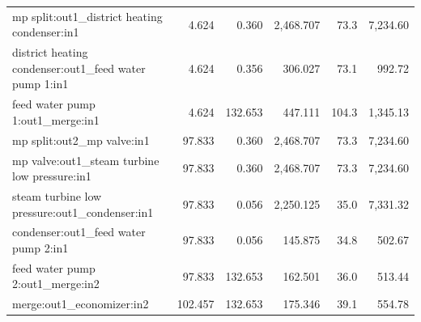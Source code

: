 \documentclass[]{article}
\begin{document}
\begin{table}[H]
\begin{tabular}{lrrrrr}
mp split:out1\_district heating condenser:in1                  &                     4.624 &                                              0.360 &                  2,468.707 &                                                       73.3 &                   7,234.60 \\
district heating condenser:out1\_feed water pump 1:in1         &                     4.624 &                                              0.356 &                    306.027 &                                                       73.1 &                     992.72 \\
feed water pump 1:out1\_merge:in1                              &                     4.624 &                                            132.653 &                    447.111 &                                                      104.3 &                   1,345.13 \\
mp split:out2\_mp valve:in1                                    &                    97.833 &                                              0.360 &                  2,468.707 &                                                       73.3 &                   7,234.60 \\
mp valve:out1\_steam turbine low pressure:in1                  &                    97.833 &                                              0.360 &                  2,468.707 &                                                       73.3 &                   7,234.60 \\
steam turbine low pressure:out1\_condenser:in1                 &                    97.833 &                                              0.056 &                  2,250.125 &                                                       35.0 &                   7,331.32 \\
condenser:out1\_feed water pump 2:in1                          &                    97.833 &                                              0.056 &                    145.875 &                                                       34.8 &                     502.67 \\
feed water pump 2:out1\_merge:in2                              &                    97.833 &                                            132.653 &                    162.501 &                                                       36.0 &                     513.44 \\
merge:out1\_economizer:in2                                     &                   102.457 &                                            132.653 &                    175.346 &                                                       39.1 &                     554.78 \\

\end{tabular}
\end{table}
\end{document}
